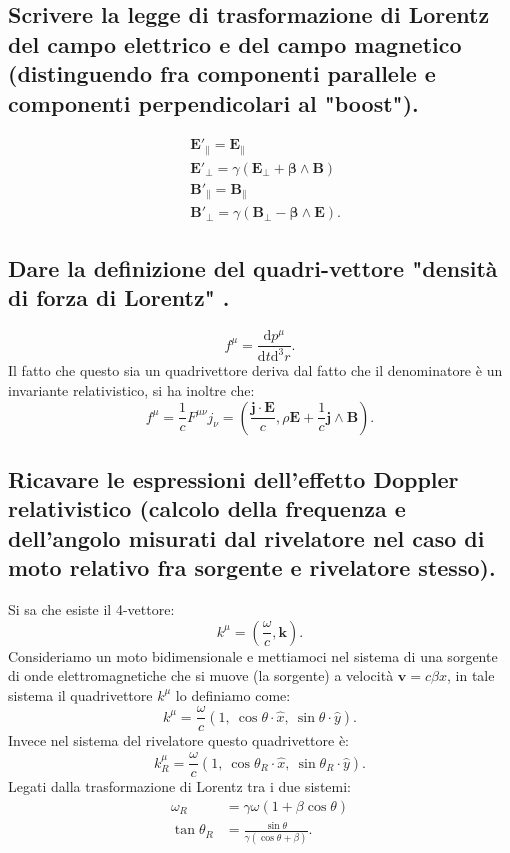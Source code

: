 \subsection[ Trasformazioni di Lorentz dei campi]{Scrivere la legge di trasformazione di Lorentz del campo elettrico e del campo magnetico (distinguendo fra componenti parallele e componenti perpendicolari al "boost").}
\label{sec:3.a.7}
\begin{align*}
	&\boldsymbol{E}'_{\|} = \boldsymbol{E}_{\|}\\
	&\boldsymbol{E}'_{\bot}=\gamma\left( \boldsymbol{E}_{\bot}+ \boldsymbol{\beta} \wedge \boldsymbol{B} \right)\\
	&\boldsymbol{B}'_{\|}=\boldsymbol{B}_{\|}\\
	&\boldsymbol{B}'_{\bot}=\gamma\left( \boldsymbol{B}_{\bot}-\boldsymbol{\beta}\wedge \boldsymbol{E}  \right) 
.\end{align*}

\subsection[ Quadrivettore densità di forza]{Dare la definizione del quadri-vettore "densità di forza di Lorentz" .}
\label{sec:3.a.8}
\[
	f^{\mu}=\frac{\mbox{d} p^{\mu}}{\mbox{d} t \text{d}^3r} 
.\] 
Il fatto che questo sia un quadrivettore deriva dal fatto che il denominatore è un invariante relativistico, si ha inoltre che:
\[
	f^{\mu}=\frac{1}{c}F^{\mu\nu}j_{\nu}=\left(\frac{\boldsymbol{j}\cdot\boldsymbol{E}}{c},\rho\boldsymbol{E}+\frac{1}{c}\boldsymbol{j}\wedge\boldsymbol{B}\right)
.\] 

\subsection[ Effetto doppler relativistico]{Ricavare le espressioni dell’effetto Doppler relativistico (calcolo della frequenza e dell’angolo misurati dal rivelatore nel caso di moto relativo fra sorgente e rivelatore stesso).}
\label{sec:3.a.9}
Si sa che esiste il 4-vettore:
\[
	k^{\mu}=\left( \frac{\omega}{c}, \boldsymbol{k} \right) 
.\]
Consideriamo un moto bidimensionale e mettiamoci nel sistema di una sorgente di onde elettromagnetiche che si muove (la sorgente) a velocità $\boldsymbol{v} =c\beta \hat{x}$, in tale sistema il quadrivettore $k^{\mu}$ lo definiamo come:
\[
	k^{\mu}=\frac{\omega}{c}\left( 1, \ \cos\theta \cdot \hat{x}, \ \sin\theta\cdot  \hat{y} \right) 
.\] 
Invece nel sistema del rivelatore questo quadrivettore è:
\[
	k^{\mu}_{R} = \frac{\omega}{c}\left( 1, \ \cos\theta_{R}\cdot \hat{x}, \ \sin\theta_{R} \cdot \hat{y} \right) 
.\] 
Legati dalla trasformazione di Lorentz tra i due sistemi:
\begin{align*}
	\omega_{R}&=\gamma\omega\left( 1 +\beta\cos\theta \right)\\ 
	\tan\theta_{R}&=\frac{\sin\theta}{\gamma\left( \cos\theta+\beta \right) }
.\end{align*}

